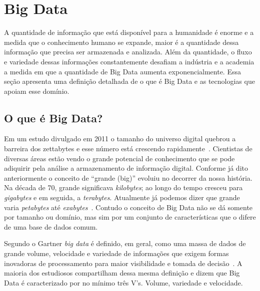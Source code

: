 \section{Big Data}


A quantidade de informação que está disponível para a humanidade é enorme e a medida que o conhecimento humano se expande, maior é a quantidade dessa informação que precisa ser armazenada e analizada. Além da quantidade, o fluxo e variedade dessas informações constantemente desafiam a indústria e a academia a medida em que a quantidade de Big Data aumenta exponencialmente. Essa seção apresenta uma definição detalhada de o que é Big Data e as tecnologias que apoiam esse domínio.

\subsection{O que é Big Data?}

Em um estudo divulgado em 2011 o tamanho do universo digital quebrou a barreira dos zettabytes e esse número está crescendo rapidamente~\cite{emcuniversedigital}. Cientistas de diversas áreas estão vendo o grande potencial de conhecimento que se pode adiquirir pela análise a armazenamento de informação digital. Conforme já dito anteriormente o conceito de ``grande (big)''  evoluiu no decorrer da nossa história. Na década de 70, grande significava \emph{kilobytes}; ao longo do tempo cresceu para \emph{gigabytes} e em seguida, a \emph{terabytes}. Atualmente já podemos dizer que grande varia \emph{petabytes}  até \emph{exabytes}~\cite{WNextBigData}. Contudo  o  conceito de Big Data não se dá somente por tamanho ou domínio, mas sim por um conjunto de características que o difere de uma base de dados comum.

Segundo o Gartner \emph{big data} é definido, em geral, como uma massa de dados de grande volume, velocidade e variedade de informações que exigem formas inovadoras de processamento para maior visibilidade e tomada de decisão~\cite{conceitoGartner}. A maioria dos estudiosos compartilham dessa mesma definição e dizem que Big Data é caracterizado por no mínimo três V's. Volume, variedade e  velocidade.~\cite{ibmbigdatavvv,fromdbtobigdata}

